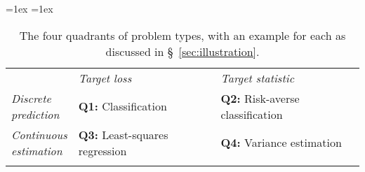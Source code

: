 \documentclass[11pt]{article} %
\begin{document}
\begin{table}[h!]
  \begin{center}
    \aboverulesep=1ex
    \belowrulesep=1ex
    \begin{tabular}{p{12ex}ll}
      & \emph{Target loss}  & \emph{Target statistic}\\
      \cmidrule[1pt]{2-3}
      \parbox{12ex}{\emph{Discrete \\ prediction}} & \textbf{Q1:} Classification  & \textbf{Q2:} Risk-averse classification\\ 
      \parbox{12ex}{\emph{Continuous \\ estimation}} & \textbf{Q3:} Least-squares regression & \textbf{Q4:} Variance estimation\\ 
      \\
    \end{tabular}
    \caption{The four quadrants of problem types, with an example for each as discussed in \S~\ref{sec:illustration}.}
    \label{tab:quadrants}
  \end{center}
\end{table}
\end{document}
